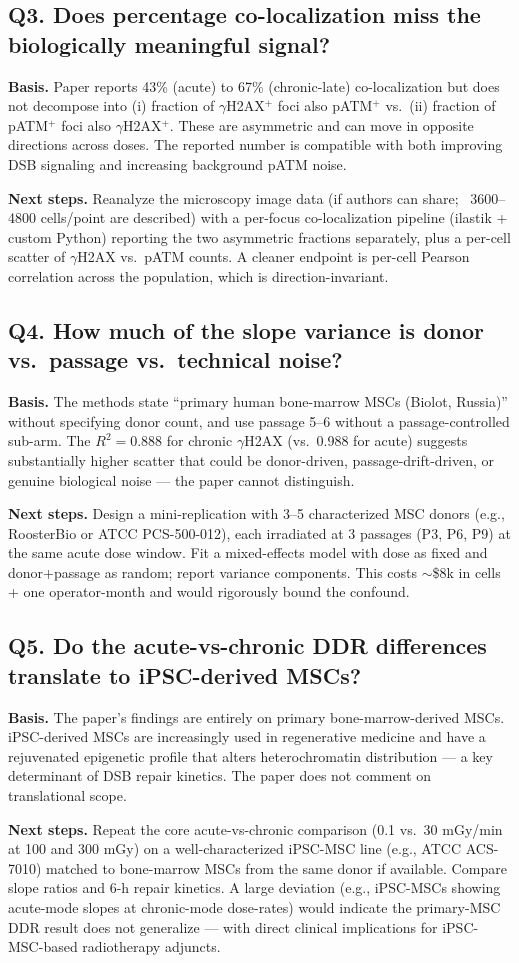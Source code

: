 \subsection*{Q3. Does percentage co-localization miss the biologically meaningful signal?}
\textbf{Basis.} Paper reports 43\% (acute) to 67\% (chronic-late) co-localization but
does not decompose into (i) fraction of $\gamma$H2AX$^+$ foci also pATM$^+$ vs.\
(ii) fraction of pATM$^+$ foci also $\gamma$H2AX$^+$. These are asymmetric and can move
in opposite directions across doses. The reported number is compatible with both
improving DSB signaling and increasing background pATM noise.

\textbf{Next steps.} Reanalyze the microscopy image data (if authors can share; ~3600--4800
cells/point are described) with a per-focus co-localization pipeline (ilastik +
custom Python) reporting the two asymmetric fractions separately, plus a per-cell
scatter of $\gamma$H2AX vs.\ pATM counts. A cleaner endpoint is per-cell Pearson
correlation across the population, which is direction-invariant.

\subsection*{Q4. How much of the slope variance is donor vs.\ passage vs.\ technical noise?}
\textbf{Basis.} The methods state ``primary human bone-marrow MSCs (Biolot, Russia)''
without specifying donor count, and use passage 5--6 without a passage-controlled
sub-arm. The $R^2 = 0.888$ for chronic $\gamma$H2AX (vs.\ 0.988 for acute) suggests
substantially higher scatter that could be donor-driven, passage-drift-driven, or
genuine biological noise --- the paper cannot distinguish.

\textbf{Next steps.} Design a mini-replication with 3--5 characterized MSC donors
(e.g., RoosterBio or ATCC PCS-500-012), each irradiated at 3 passages (P3, P6, P9) at
the same acute dose window. Fit a mixed-effects model with dose as fixed and
donor+passage as random; report variance components. This costs $\sim$\$8k in cells +
one operator-month and would rigorously bound the confound.

\subsection*{Q5. Do the acute-vs-chronic DDR differences translate to iPSC-derived MSCs?}
\textbf{Basis.} The paper's findings are entirely on primary bone-marrow-derived MSCs.
iPSC-derived MSCs are increasingly used in regenerative medicine and have a rejuvenated
epigenetic profile that alters heterochromatin distribution --- a key determinant of
DSB repair kinetics. The paper does not comment on translational scope.

\textbf{Next steps.} Repeat the core acute-vs-chronic comparison (0.1 vs.\ 30 mGy/min
at 100 and 300 mGy) on a well-characterized iPSC-MSC line (e.g., ATCC ACS-7010) matched
to bone-marrow MSCs from the same donor if available. Compare slope ratios and 6-h
repair kinetics. A large deviation (e.g., iPSC-MSCs showing acute-mode slopes at
chronic-mode dose-rates) would indicate the primary-MSC DDR result does not generalize
--- with direct clinical implications for iPSC-MSC-based radiotherapy adjuncts.
